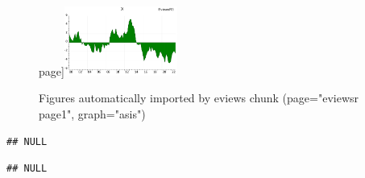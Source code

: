\documentclass[
]{article}
\newenvironment{Shaded}{\begin{snugshade}}{\end{snugshade}}
\newcommand{\ErrorTok}[1]{\textcolor[rgb]{0.64,0.00,0.00}{\textbf{#1}}}
\newcommand{\FunctionTok}[1]{\textcolor[rgb]{0.00,0.00,0.00}{#1}}
\newcommand{\NormalTok}[1]{#1}
\newcommand{\SpecialCharTok}[1]{\textcolor[rgb]{0.00,0.00,0.00}{#1}}
\newcommand{\StringTok}[1]{\textcolor[rgb]{0.31,0.60,0.02}{#1}}
\begin{document}
\begin{figure}[h]
page\label{fig:ev-6}]{\includegraphics[width=0.33\textwidth,height=0.25\textwidth]{test_files/figure-latex//ev-EviewsR3-GRAPH1} }\hfill{}

\caption{Figures automatically imported by eviews chunk (page="eviewsr page1", graph="asis")}\label{fig:ev}
\end{figure}

\begin{Shaded}
\end{Shaded}

\begin{verbatim}
## NULL
\end{verbatim}

\begin{Shaded}
\end{Shaded}

\begin{verbatim}
## NULL
\end{verbatim}

\begin{Shaded}
\end{Shaded}
\end{document}
